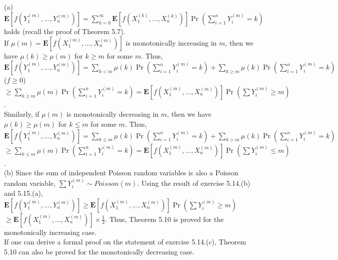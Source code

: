 \documentclass{article}
\begin{document}
\subsection{}
(a) $\textbf{E}[f(Y_1^{(m)},...,Y_n^{(m)})]=\sum\limits_{k=0}^\infty\textbf{E}[f(X_1^{(k)},...,X_n^{(k)})]\Pr(\sum\limits_{i=1}^nY_i^{(m)}=k)$
holds (recall the proof of Theorem 5.7).\\
If $\mu(m)=\textbf{E}[f(X_1^{(m)},...,X_n^{(m)})]$ is monotonically increasing in $m$, then we have $\mu(k)\geq\mu(m)$ for $k\geq m$ for some $m$.
Thus, $\textbf{E}[f(Y_1^{(m)},...,Y_n^{(m)})]=\sum\limits_{k<m}\mu(k)\Pr(\sum\limits_{i=1}^n Y_i^{(m)}=k)+\sum\limits_{k\geq m}\mu(k)\Pr(\sum\limits_{i=1}^n Y_i^{(m)}=k)$ ($f\geq 0$)\\
$\geq \sum\limits_{k\geq m}\mu(m)\Pr(\sum\limits_{i=1}^n Y_i^{(m)}=k)=\textbf{E}[f(X_1^{(m)},...,X_n^{(m)})]\Pr(\sum Y_i^{(m)}\geq m)$.\\
Similarly, if $\mu(m)$ is monotonically decreasing in $m$, then we have $\mu(k)\geq\mu(m)$ for $k\leq m$ for some $m$. Thus,\\
$\textbf{E}[f(Y_1^{(m)},...,Y_n^{(m)})]=\sum\limits_{k\leq m}\mu(k)\Pr(\sum\limits_{i=1}^n Y_i^{(m)}=k)+\sum\limits_{k> m}\mu(k)\Pr(\sum\limits_{i=1}^n Y_i^{(m)}=k)$\\
$\geq \sum\limits_{k\leq m}\mu(m)\Pr(\sum\limits_{i=1}^n Y_i^{(m)}=k)=\textbf{E}[f(X_1^{(m)},...,X_n^{(m)})]\Pr(\sum Y_i^{(m)}\leq m)$.\\
(b) Since the sum of independent Poisson random variables is also a Poisson random variable, $\sum Y_i^{(m)}\sim Poisson(m)$.
Using the result of exercise 5.14.(b) and 5.15.(a), $\textbf{E}[f(Y_1^{(m)},...,Y_n^{(m)})]\geq \textbf{E}[f(X_1^{(m)},...,X_n^{(m)})]\Pr(\sum Y_i^{(m)}\geq m)$\\
$\geq \textbf{E}[f(X_1^{(m)},...,X_n^{(m)})]\times \frac{1}{2}$.
Thus, Theorem 5.10 is proved for the monotonically increasing case.\\
If one can derive a formal proof on the statement of exercise 5.14.(c), Theorem 5.10 can also be proved for the monotonically decreasing case.
\end{document}
